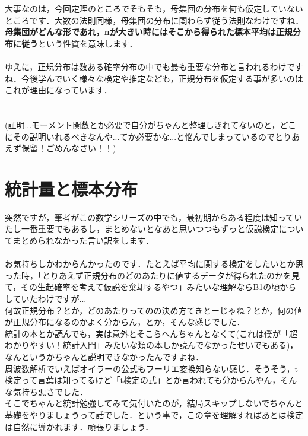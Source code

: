 \documentclass[11pt,a4paper,uplatex]{ujreport} 	%
\begin{document}
大事なのは，今回定理のところでそもそも，母集団の分布を何も仮定していないところです．大数の法則同様，母集団の分布に関わらず従う法則なわけですね．\\

\textbf{母集団がどんな形であれ，nが大きい時にはそこから得られた標本平均は正規分布に従う}という性質を意味します．\\
\\

ゆえに，正規分布は数ある確率分布の中でも最も重要な分布と言われるわけですね．今後学んでいく様々な検定や推定なども，正規分布を仮定する事が多いのはこれが理由になっています．\\
\\
\\

(証明...モーメント関数とか必要で自分がちゃんと整理しきれてないのと，どこにその説明いれるべきなんや...てか必要かな...と悩んでしまっているのでとりあえず保留！ごめんなさい！！)


\chapter{統計量と標本分布}
突然ですが，筆者がこの数学シリーズの中でも，最初期からある程度は知っていたし一番重要でもあるし，まとめないとなあと思いつつもずっと仮説検定についてまとめられなかった言い訳をします．\\
\\

お気持ちしかわからんかったのです．たとえば平均に関する検定をしたいとか思った時，「とりあえず正規分布のどのあたりに値するデータが得られたのかを見て，その生起確率を考えて仮説を棄却するやつ」みたいな理解ならB1の頃からしていたわけですが...\\

何故正規分布？とか，どのあたりってのの決め方てきとーじゃね？とか，何の値が正規分布になるのかよく分からん，とか，そんな感じでした．\\

統計の本とか読んでも，実は意外とそこらへんちゃんとなくて(これは僕が「超わかりやすい！統計入門」みたいな類の本しか読んでなかったせいでもある)，なんというかちゃんと説明できなかったんですよね．\\

周波数解析でいえばオイラーの公式もフーリエ変換知らない感じ．そうそう，t検定って言葉は知ってるけど「t検定の式」とか言われても分からんやん，そんな気持ち悪さでした．\\

そこでちゃんと統計勉強してみて気付いたのが，結局スキップしないでちゃんと基礎をやりましょうって話でした．という事で，この章を理解すればあとは検定は自然に導かれます．頑張りましょう．
\end{document}

